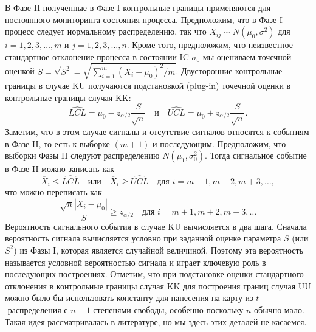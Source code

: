 В Фазе II полученные в Фазе I контрольные границы применяются для постоянного мониторинга состояния процесса. Предположим, что в Фазе I процесс следует нормальному распределению, так что \(X_{ij} \sim N(\mu_0, \sigma^2)\) для \(i = 1, 2, 3, \ldots, m\) и \(j = 1, 2, 3, \ldots, n\). Кроме того, предположим, что неизвестное стандартное отклонение процесса в состоянии IC \(\sigma_0\) мы оцениваем точечной оценкой \(S = \sqrt{S^2} = \sqrt{\sum_{i=1}^{m}(X_i - \mu_0)^2/m}\). Двусторонние контрольные границы в случае KU получаются подстановкой (plug-in) точечной оценки в контрольные границы случая KK:
\[
	\widehat{LCL} = \mu_0 - z_{\alpha/2}\frac{S}{\sqrt{n}} \quad\text{и}\quad
	\widehat{UCL} = \mu_0 + z_{\alpha/2}\frac{S}{\sqrt{n}}.
\]
Заметим, что в этом случае сигналы и отсутствие сигналов относятся к событиям в Фазе II, то есть к выборке \((m + 1)\) и последующим. Предположим, что выборки Фазы II следуют распределению \(N(\mu_1, \sigma_0^2)\). Тогда сигнальное событие в Фазе II можно записать как
\[
	\overline{X}_i \le \widehat{LCL} \quad\text{или}\quad \overline{X}_i \ge \widehat{UCL}
	\quad\text{для } i = m + 1, m + 2, m + 3, \ldots,
\]
что можно переписать как
\[
	\frac{\sqrt{n}|\overline{X}_i - \mu_0|}{S} \ge z_{\alpha/2}
	\quad\text{для } i = m + 1, m + 2, m + 3, \ldots
\]
Вероятность сигнального события в случае KU вычисляется в два шага. Сначала вероятность сигнала вычисляется условно при заданной оценке параметра \(S\) (или \(S^2\)) из Фазы I, которая является случайной величиной. Поэтому эта вероятность называется условной вероятностью сигнала и играет ключевую роль в последующих построениях. Отметим, что при подстановке оценки стандартного отклонения в контрольные границы случая KK для построения границ случая UU можно было бы использовать константу для нанесения на карту из \(t\)-распределения с \(n - 1\) степенями свободы, особенно поскольку \(n\) обычно мало. Такая идея рассматривалась в литературе, но мы здесь этих деталей не касаемся.


